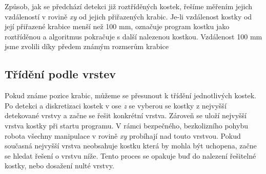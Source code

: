 \documentclass[journal,twoside,web]{ieeecolor}
\begin{document}
Způsob, jak se předchází detekci již roztříděných kostek, řešíme měřením jejich vzdáleností v rovině \textit{xy} od jejich přiřazených krabic.
Je-li vzdálenost kostky od její přiřazené krabice menší než 100 mm, označuje program kostku jako roztříděnou a algoritmus pokračuje s další nalezenou kostkou.
Vzdálenost 100 mm jsme zvolili díky předem známým rozmerům krabice




\subsection{Třídění podle vrstev}
Pokud známe pozice krabic, můžeme se přesunout k třídění jednotlivých kostek. Po detekci a diskretizaci kostek v ose \textit{z} se vyberou se kostky
z nejvyšší detekované vrstvy a začne se řešit konkrétní vrstva. Zároveň se uloží nejvyšší vrstva kostky při startu programu. V rámci bezpečného, bezkolizního
pohybu robota všechny manipulace v rovině \textit{xy} probíhají nad touto vrstvou. Pokud současná nejvyšší vrstva neobsahuje kostku která by mohla být uchopena, %
začne se hledat řešení o vrstvu níže. Tento proces se opakuje buď do nalezení řešitelné kostky, nebo dosažení nulté vrstvy.
\end{document}
